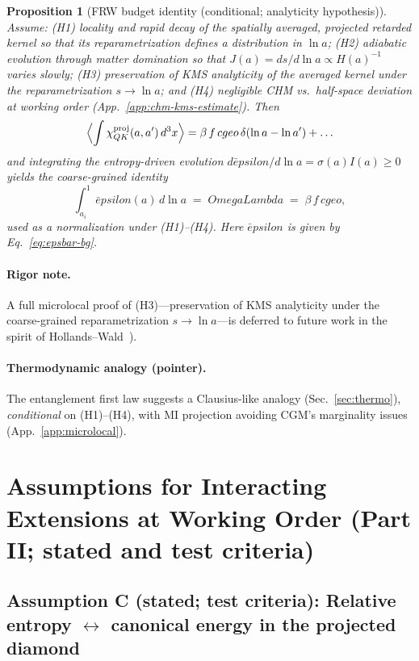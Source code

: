 \documentclass[aps,prd,onecolumn,superscriptaddress,nofootinbib]{revtex4-2}
\def\OmL{OmegaLambda}%
\def\cgeo{cgeo}%
\def\eps{epsilon}%
\def\Omega_\Lambda{OmegaLambda}%
\providecommand{\OmL}{\Omega_\Lambda}
\providecommand{\cgeo}{c_{\rm geo}}
\providecommand{\eps}{\varepsilon}
\providecommand{\be}{\begin{equation}}
\providecommand{\ee}{\end{equation}}
\newtheorem{proposition}{Proposition}
\begin{document}
\begin{proposition}[FRW budget identity (conditional; analyticity hypothesis)]
\label{prop:frw-budget}
Assume: (H1) locality and rapid decay of the spatially averaged, projected retarded kernel so that its reparametrization defines a distribution in \(\ln a\); (H2) adiabatic evolution through matter domination so that \(J(a)=ds/d\ln a\propto H(a)^{-1}\) varies slowly; (H3) preservation of KMS analyticity of the averaged kernel under the reparametrization \(s\!\to\!\ln a\); and (H4) negligible CHM vs.\ half-space deviation at working order (App.~\ref{app:chm-kms-estimate}). Then
\[
\Big\langle \!\int \chi^{\rm proj}_{QK}(a,a')\,d^3x \Big\rangle
= \beta\, f\, \cgeo\, \delta(\ln a-\ln a') + \ldots
\]
and integrating the entropy-driven evolution \(d\bar\eps/d\ln a=\sigma(a)I(a)\ge0\) yields the coarse-grained identity
\be
\int_{a_i}^{1}\!\bar\eps(a)\,d\ln a \;=\; \OmL \;=\; \beta\, f\,\cgeo,
\label{eq:budget}
\ee
used as a normalization under (H1)–(H4). Here \(\bar\eps\) is given by Eq.~\eqref{eq:epsbar-bg}.
\end{proposition}

\paragraph{Rigor note.}
A full microlocal proof of (H3)—preservation of KMS analyticity under the coarse-grained reparametrization \(s\!\to\!\ln a\)—is deferred to future work in the spirit of Hollands–Wald~\cite{HollandsWald2001}).

\paragraph{Thermodynamic analogy (pointer).}
The entanglement first law suggests a Clausius-like analogy (Sec.~\ref{sec:thermo}), \emph{conditional} on (H1)–(H4), with MI projection avoiding CGM’s marginality issues (App.~\ref{app:microlocal}).

\section{Assumptions for Interacting Extensions at Working Order (Part II; stated and test criteria)}
\label{sec:proofs}

\subsection{Assumption C (stated; test criteria): Relative entropy \texorpdfstring{$\leftrightarrow$}{<->} canonical energy in the projected diamond}
\label{sec:lemmaC}
\end{document}
